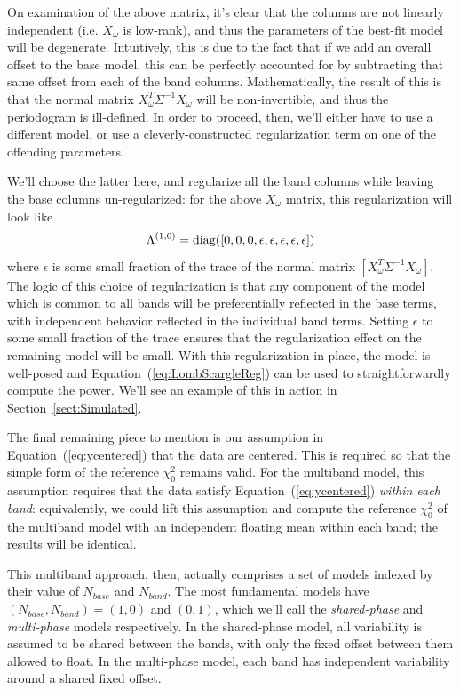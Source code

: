 \documentclass[12pt,preprint]{aastex}
\newcommand{\Eq}[1]{Equation~(\ref{eq:#1})}
\newcommand{\eq}[1]{\Eq{#1}}
\newcommand{\Sect}[1]{Section~\ref{sect:#1}}
\newcommand{\sect}[1]{\Sect{#1}}
\begin{document}
On examination of the above matrix, it's clear that the columns are not linearly independent (i.e. $X_\omega$ is low-rank), and thus the parameters of the best-fit model will be degenerate. Intuitively, this is due to the fact that if we add an overall offset to the base model, this can be perfectly accounted for by subtracting that same offset from each of the band columns. Mathematically, the result of this is that the normal matrix $X_\omega^T\Sigma^{-1}X_\omega$ will be non-invertible, and thus the periodogram is ill-defined. In order to proceed, then, we'll either have to use a different model, or use a cleverly-constructed regularization term on one of the offending parameters.

We'll choose the latter here, and regularize all the band columns while leaving the base columns un-regularized: for the above $X_\omega$ matrix, this regularization will look like
\begin{equation}
  \Lambda^{(1,0)} = {\rm diag}([0, 0, 0, \epsilon, \epsilon, \epsilon, \epsilon, \epsilon])
\end{equation}
where $\epsilon$ is some small fraction of the trace of the normal matrix $[X_\omega^T\Sigma^{-1}X_\omega]$. The logic of this choice of regularization is that any component of the model which is common to all bands will be preferentially reflected in the base terms, with independent behavior reflected in the individual band terms. Setting $\epsilon$ to some small fraction of the trace ensures that the regularization effect on the remaining model will be small. With this regularization in place, the model is well-posed and \eq{LombScargleReg} can be used to straightforwardly compute the power. We'll see an example of this in action in \sect{Simulated}.

The final remaining piece to mention is our assumption in \eq{ycentered} that the data are centered. This is required so that the simple form of the reference $\chi^2_0$ remains valid. For the multiband model, this assumption requires that the data satisfy \eq{ycentered} {\it within each band}: equivalently, we could lift this assumption and compute the reference $\chi^2_0$ of the multiband model with an independent floating mean within each band; the results will be identical.

This multiband approach, then, actually comprises a set of models indexed by their value of $N_{base}$ and $N_{band}$. The most fundamental models have $(N_{base}, N_{band}) = (1,0)$ and $(0,1)$, which we'll call the {\it shared-phase} and {\it multi-phase} models respectively. In the shared-phase model, all variability is assumed to be shared between the bands, with only the fixed offset between them allowed to float. In the multi-phase model, each band has independent variability around a shared fixed offset.
\end{document}
